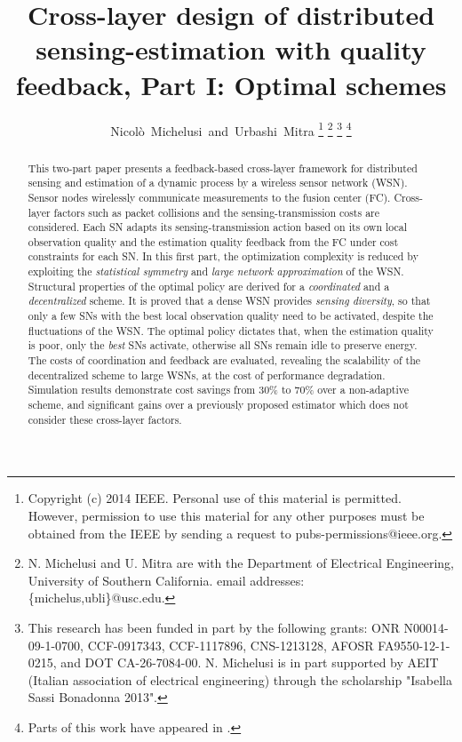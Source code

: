 \documentclass[10pt,twocolumn,twoside]{IEEEtran}
\theoremstyle{plain}
\begin{document}
\title{
Cross-layer design of distributed sensing-estimation  with quality feedback, Part I: Optimal schemes
}
\author{Nicol\`{o}~Michelusi~and~Urbashi~Mitra
\thanks{Copyright (c) 2014 IEEE. Personal use of this material is permitted. However, permission to use this material for any other purposes must be obtained from the IEEE by sending a request to pubs-permissions@ieee.org.}
\thanks{N. Michelusi and U. Mitra are with the Department of Electrical Engineering, University of Southern California. email addresses: \{michelus,ubli\}@usc.edu.}
\thanks{This research has been funded in part by the following grants:
ONR N00014-09-1-0700, CCF-0917343, CCF-1117896, CNS-1213128, AFOSR FA9550-12-1-0215, and DOT CA-26-7084-00.
N. Michelusi is in part supported by AEIT (Italian association of electrical engineering) through the scholarship "Isabella Sassi Bonadonna 2013".
}
\thanks{Parts of this work have appeared in \cite{MicheAllerton,MicheGlobalsip}.}
\vspace{-5mm}}
\maketitle
\noindent\begin{abstract}
This two-part paper presents a feedback-based cross-layer framework for distributed sensing and estimation of a dynamic process by a wireless sensor network (WSN).  Sensor nodes wirelessly communicate measurements to the fusion center (FC). Cross-layer factors such as packet collisions and the sensing-transmission costs are considered. Each SN adapts its sensing-transmission action based on its own local observation quality and the estimation quality feedback from the FC under cost constraints for each SN. In this first part, the optimization complexity is reduced by exploiting the \emph{statistical symmetry} and \emph{large network approximation} of the WSN. Structural properties of the optimal policy are derived for a \emph{coordinated} and a \emph{decentralized} scheme. It is proved that a dense WSN provides \emph{sensing diversity}, so that only a few SNs with the best local observation quality need to be activated, despite the fluctuations of the WSN. The optimal policy dictates that, when the estimation quality is poor, only the \emph{best} SNs activate, otherwise all SNs remain idle to preserve energy. The costs of coordination and feedback are evaluated, revealing the scalability of the decentralized scheme to large WSNs, at the cost of performance degradation. Simulation results demonstrate cost savings from 30\% to 70\% over a non-adaptive scheme, and significant gains over a previously proposed estimator which does not consider these cross-layer factors.
\end{abstract}
\vspace{-5mm}
\end{document}
